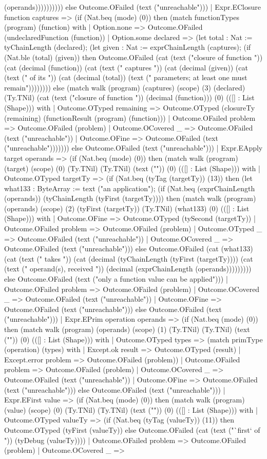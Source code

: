 \documentclass[11pt]{article}
\begin{document}
(operands)))))))))) else Outcome.OFailed (text ("unreachable"))) | Expr.EClosure function captures => (if (Nat.beq (mode) (0)) then (match functionTypes (program) (function) with | Option.none => Outcome.OFailed (undeclaredFunction (function)) | Option.some declared => (let total : Nat := tyChainLength (declared); (let given : Nat := exprChainLength (captures); (if (Nat.ble (total) (given)) then Outcome.OFailed (cat (text ("closure of function ")) (cat (decimal (function)) (cat (text (" captures ")) (cat (decimal (given)) (cat (text (" of its ")) (cat (decimal (total)) (text (" parameters; at least one must remain")))))))) else (match walk (program) (captures) (scope) (3) (declared) (Ty.TNil) (cat (text ("closure of function ")) (decimal (function))) (0) (([] : List (Shape))) with | Outcome.OTyped remaining => Outcome.OTyped (closureTy (remaining) (functionResult (program) (function))) | Outcome.OFailed problem => Outcome.OFailed (problem) | Outcome.OCovered \_ => Outcome.OFailed (text ("unreachable")) | Outcome.OFine => Outcome.OFailed (text ("unreachable"))))))) else Outcome.OFailed (text ("unreachable"))) | Expr.EApply target operands => (if (Nat.beq (mode) (0)) then (match walk (program) (target) (scope) (0) (Ty.TNil) (Ty.TNil) (text ("")) (0) (([] : List (Shape))) with | Outcome.OTyped targetTy => (if (Nat.beq (tyTag (targetTy)) (13)) then (let what133 : ByteArray := text ("an application"); (if (Nat.beq (exprChainLength (operands)) (tyChainLength (tyFirst (targetTy)))) then (match walk (program) (operands) (scope) (2) (tyFirst (targetTy)) (Ty.TNil) (what133) (0) (([] : List (Shape))) with | Outcome.OFine => Outcome.OTyped (tySecond (targetTy)) | Outcome.OFailed problem => Outcome.OFailed (problem) | Outcome.OTyped \_ => Outcome.OFailed (text ("unreachable")) | Outcome.OCovered \_ => Outcome.OFailed (text ("unreachable"))) else Outcome.OFailed (cat (what133) (cat (text (" takes ")) (cat (decimal (tyChainLength (tyFirst (targetTy)))) (cat (text (" operand(s), received ")) (decimal (exprChainLength (operands))))))))) else Outcome.OFailed (text ("only a function value can be applied"))) | Outcome.OFailed problem => Outcome.OFailed (problem) | Outcome.OCovered \_ => Outcome.OFailed (text ("unreachable")) | Outcome.OFine => Outcome.OFailed (text ("unreachable"))) else Outcome.OFailed (text ("unreachable"))) | Expr.EPrim operation operands => (if (Nat.beq (mode) (0)) then (match walk (program) (operands) (scope) (1) (Ty.TNil) (Ty.TNil) (text ("")) (0) (([] : List (Shape))) with | Outcome.OTyped types => (match primType (operation) (types) with | Except.ok result => Outcome.OTyped (result) | Except.error problem => Outcome.OFailed (problem)) | Outcome.OFailed problem => Outcome.OFailed (problem) | Outcome.OCovered \_ => Outcome.OFailed (text ("unreachable")) | Outcome.OFine => Outcome.OFailed (text ("unreachable"))) else Outcome.OFailed (text ("unreachable"))) | Expr.EFirst value => (if (Nat.beq (mode) (0)) then (match walk (program) (value) (scope) (0) (Ty.TNil) (Ty.TNil) (text ("")) (0) (([] : List (Shape))) with | Outcome.OTyped valueTy => (if (Nat.beq (tyTag (valueTy)) (11)) then Outcome.OTyped (tyFirst (valueTy)) else Outcome.OFailed (cat (text ("`first` of ")) (tyDebug (valueTy)))) | Outcome.OFailed problem => Outcome.OFailed (problem) | Outcome.OCovered \_ => 
\end{document}
